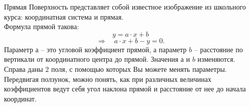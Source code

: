 \begin{surferPage}{Прямая}
Поверхность представляет собой известное изображение из школьного курса: координатная система и прямая. \\Формула прямой такова:
\[y=a\cdot x + b\]
\[ \Rightarrow \quad a\cdot x +b -y=0.\]
Параметр $а$ – это угловой коэффициент прямой, а параметр $b$ – расстояние по вертикали от координатного центра до прямой.
\newline \newline
Значения $а$ и $b$ изменяются. Справа даны $2$ поля, с помощью которых Вы можете менять параметры. Передвигая ползунок, можно понять, как при различных величинах коэффициентов ведут себя угол наклона прямой и расстояние от нее до начала координат.
\end{surferPage}
